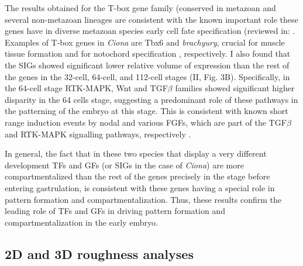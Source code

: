 The results obtained for the T-box gene family (conserved in metazoan and several non-metazoan lineages \citep{Sebe-Pedros2013} are consistent with the known important role these genes have in diverse metazoan species early cell fate specification (reviewed in: \citealp{Papaioannou2014,Showell2004}.
Examples of T-box genes in \textit{Ciona} are Tbx6 and \textit{brachyury}, crucial for muscle tissue formation \citep{Mitani1999,Nishida2005} and for notochord specification \citep{Yasuo1998}, respectively.
I also found that the SIGs showed significant lower relative volume of expression than the rest of the genes in the 32-cell, 64-cell, and 112-cell stages (II, Fig. 3B).
Specifically, in the 64-cell stage RTK-MAPK, Wnt and TGF$\beta$ families showed significant higher disparity in the 64 cells stage, suggesting a predominant role of these pathways in the patterning of the embryo at this stage. 
This is consistent with known short range induction events by nodal and various FGFs, which are part of the TGF$\beta$ and RTK-MAPK signalling pathways, respectively \citep{Lemaire2008}.


In general, the fact that in these two species that display a very different development TFs and GFs (or SIGs in the case of \textit{Ciona}) are more compartmentalized than the rest of the genes precisely in the stage before entering gastrulation, is consistent with these genes having a special role in pattern formation and compartmentalization.
Thus, these results confirm the leading role of TFs and GFs in driving pattern formation and compartmentalization in the early embryo.

\subsection{2D and 3D roughness analyses}


